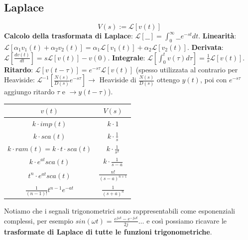 \begin{landscape}
\begin{multicols*}{3}
    \subsection{Laplace}
    \[
        V(s) := \mathcal{L}[v(t)]
    \]
    \textbf{Calcolo della trasformata di Laplace}: $\mathcal{L}[\_\_] =  \int_{0}^{\infty}\_\_ e^{-st} dt$.\newline
    \textbf{Linearità}: $\mathcal{L}[\alpha_1 v_1(t) + \alpha_2 v_2(t)] = \alpha_1 \mathcal{L}[v_1(t)] + \alpha_2 \mathcal{L}[v_2(t)]$.\newline
    \textbf{Derivata}: $\mathcal{L}\left[ \frac{d v(t)}{dt} \right] = s \mathcal{L}[v(t)] - v(0)$.\newline
    \textbf{Integrale}: $\mathcal{L}\left[ \int_{0}^{t} v(\tau) d \tau \right] = \frac{1}{s} \mathcal{L}[v(t)]$.\newline
    \textbf{Ritardo}: $ \mathcal{L}[ v(t - \tau)] = e^{-s \tau} \mathcal{L}[v(t)]$ (spesso utilizzata al contrario per Heaviside: $\mathcal{L}^{-1}\left[\frac{N(s)}{D(s)}e^{-s \tau}\right] \rightarrow $ Heaviside di $\frac{N(s)}{D(s)}$ ottengo $y(t)$, poi con $e^{-s \tau}$ aggiungo ritardo $\tau$ e $\rightarrow  y(t- \tau)$).\newline
    \renewcommand{\arraystretch}{2}
    \begin{center}
        \begin{tabular}{ |c|c| } 
        \hline
        \;\;\;\;\;\;\;\;\;\;\;\;\;\;\;$v(t)$ \;\;\;\;\;\;\;\;\;\;\;\;\;\;\;& \;\;\;\;\;\;\;\;\;\;\;\;\;\;\;$V(s)$ \;\;\;\;\;\;\;\;\;\;\;\;\;\;\;\\ 
        \hline
        $k \cdot imp(t)$ & $k \cdot 1$ \\ 
        $k \cdot sca(t)$ & $k \cdot \frac{1}{s}$  \\ 
        $k \cdot ram(t) =k \cdot t \cdot  sca(t)$ & $k \cdot \frac{1}{s^2}$ \\
        $k \cdot e^{at}sca(t)$ & $k \cdot \frac{1}{s-a}$ \\ 
        $t^{n}\cdot e^{at}sca(t)$ & $\frac{n!}{(s-a)^{n+1}}$\\ 
        $\frac{1}{(n-1)!} t^{n-1}e^{-at}$ & $\frac{1}{(s+a)^n}$\\
        \hline
        \end{tabular}
    \end{center}
    \renewcommand{\arraystretch}{1}
    Notiamo che i segnali trigonometrici sono rappresentabili come esponenziali complessi, per esempio $sin(\omega t) = \frac{e^{j \omega t}- e^{-j \omega t}}{2j} \dots$ e così possiamo ricavare le \textbf{trasformate di Laplace di tutte le funzioni trigonometriche}.\newline

\end{multicols*}
\end{landscape}
